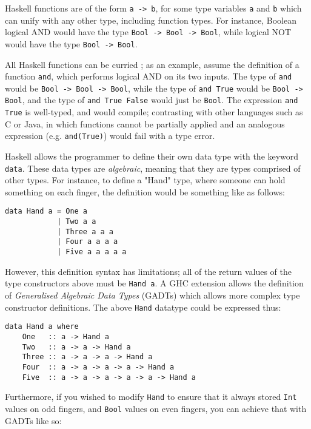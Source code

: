 \documentclass[12pt, a4paper, bibliography=totocnumbered]{scrreprt}
\newcommand{\inline}[1]{\lstinline[basicstyle=\ttfamily\footnotesize]{#1}}
\begin{document}
Haskell functions are of the form \inline{a -> b}, for some type variables \inline{a} and \inline{b} which can unify with any other type, including function types. For instance, Boolean logical AND would have the type \inline{Bool -> Bool -> Bool}, while logical NOT would have the type \inline{Bool -> Bool}.

All Haskell functions can be curried \cite{currying}; as an example, assume the definition of a function \inline{and}, which performs logical AND on its two inputs. The type of \inline{and} would be \inline{Bool -> Bool -> Bool}, while the type of \inline{and True} would be \inline{Bool -> Bool}, and the type of \inline{and True False} would just be \inline{Bool}. The expression \inline{and True} is well-typed, and would compile; contrasting with other languages such as C or Java, in which functions cannot be partially applied and an analogous expression (e.g. \inline{and(True)}) would fail with a type error.

Haskell allows the programmer to define their own data type with the keyword \inline{data}. These data types are \emph{algebraic}, meaning that they are types comprised of other types. For instance, to define a "Hand" type, where someone can hold something on each finger, the definition would be something like as follows:

\begin{lstlisting}
data Hand a = One a
            | Two a a
            | Three a a a
            | Four a a a a
            | Five a a a a a
\end{lstlisting}

However, this definition syntax has limitations; all of the return values of the type constructors above must be \inline{Hand a}. A GHC extension allows the definition of \emph{Generalised Algebraic Data Types} (GADTs) \cite{gadts} which allows more complex type constructor definitions. The above \inline{Hand} datatype could be expressed thus:

\begin{lstlisting}
data Hand a where
    One   :: a -> Hand a
    Two   :: a -> a -> Hand a
    Three :: a -> a -> a -> Hand a
    Four  :: a -> a -> a -> a -> Hand a
    Five  :: a -> a -> a -> a -> a -> Hand a
\end{lstlisting}

Furthermore, if you wished to modify \inline{Hand} to ensure that it always stored \inline{Int} values on odd fingers, and \inline{Bool} values on even fingers, you can achieve that with GADTs like so:
\end{document}
